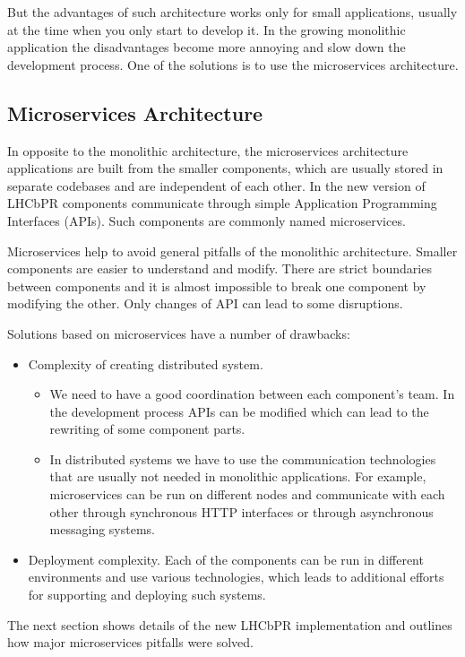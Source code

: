 \documentclass[10pt]{iopart}
\begin{document}
But the advantages of such architecture works only for small applications,
usually at the time when you only start to develop it. In the growing
monolithic application the disadvantages become more annoying and slow down the
development process. One of the solutions is to use the microservices architecture.  

\subsection{Microservices Architecture}

In opposite to the monolithic architecture, the microservices architecture
applications are built from the smaller components, which are usually  stored
in separate codebases and are independent of each other. In the new version of LHCbPR
components communicate through simple Application Programming
Interfaces (APIs). Such components are commonly named microservices.

Microservices help to avoid general pitfalls of the monolithic architecture.
Smaller components are easier to understand and modify. There are strict boundaries
between components and it is almost impossible to break one component by modifying
the other. Only changes of API can lead to some  disruptions.   

Solutions based on microservices have a number of drawbacks:
\begin{itemize}
\item Complexity of creating distributed system.
\begin{itemize}
\item We need to have a good coordination between  each component's team. In 
the development process APIs can be modified which can lead to the rewriting of
some component parts. 
\item In distributed systems we have to use the communication technologies that
are usually not needed in monolithic applications. For example, microservices can be
run on different nodes and communicate with each other through synchronous HTTP
interfaces or through asynchronous messaging systems.  
\end{itemize}
\item Deployment complexity.  Each of the components can be run in  different
environments and use various technologies, which leads to additional efforts for
supporting and deploying such systems.
\end{itemize}

The next section shows details of the new LHCbPR implementation and outlines how
major microservices pitfalls were solved.
\end{document}

